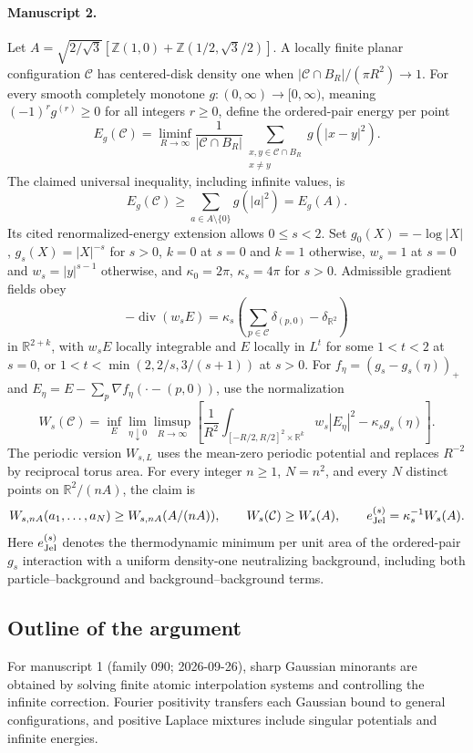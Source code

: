 \documentclass[11pt]{article}
\begin{document}
\paragraph{Manuscript 2.}
Let $A=\sqrt{2/\sqrt3}[\mathbb Z(1,0)+\mathbb Z(1/2,\sqrt3/2)]$. A locally finite planar configuration $\mathcal C$ has centered-disk density one when $|\mathcal C\cap B_R|/(\pi R^2)\to1$. For every smooth completely monotone $g:(0,\infty)\to[0,\infty)$, meaning $(-1)^rg^{(r)}\ge0$ for all integers $r\ge0$, define the ordered-pair energy per point
\[
 E_g(\mathcal C)=\liminf_{R\to\infty}\frac1{|\mathcal C\cap B_R|}
 \sum_{\substack{x,y\in\mathcal C\cap B_R\\x\ne y}}g(|x-y|^2).
\]
The claimed universal inequality, including infinite values, is
\[
 E_g(\mathcal C)\ge\sum_{a\in A\setminus\{0\}}g(|a|^2)=E_g(A).
\]
Its cited renormalized-energy extension allows $0\le s<2$. Set $g_0(X)=-\log|X|$, $g_s(X)=|X|^{-s}$ for $s>0$, $k=0$ at $s=0$ and $k=1$ otherwise, $w_s=1$ at $s=0$ and $w_s=|y|^{s-1}$ otherwise, and $\kappa_0=2\pi$, $\kappa_s=4\pi$ for $s>0$. Admissible gradient fields obey
\[
 -\operatorname{div}(w_sE)=\kappa_s(\sum_{p\in\mathcal C}\delta_{(p,0)}-\delta_{\mathbb R^2})
\]
in $\mathbb R^{2+k}$, with $w_sE$ locally integrable and $E$ locally in $L^t$ for some $1<t<2$ at $s=0$, or $1<t<\min(2,2/s,3/(s+1))$ at $s>0$. For $f_{\eta}=(g_s-g_s(\eta))_+$ and $E_{\eta}=E-\sum_p\nabla f_{\eta}(\cdot-(p,0))$, use the normalization
\[
 W_s(\mathcal C)=\inf_E\lim_{\eta\downarrow0}\limsup_{R\to\infty}
 \left[\frac1{R^2}\int_{[-R/2,R/2]^2\times\mathbb R^k}w_s|E_{\eta}|^2
                -\kappa_sg_s(\eta)\right].
\]
The periodic version $W_{s,L}$ uses the mean-zero periodic potential and replaces $R^{-2}$ by reciprocal torus area. For every integer $n\ge1$, $N=n^2$, and every $N$ distinct points on $\mathbb R^2/(nA)$, the claim is
\[
 W_{s,nA}(a_1,\ldots,a_N)\ge W_{s,nA}(A/(nA)),\qquad
 W_s(\mathcal C)\ge W_s(A),\qquad
 e_{\rm Jel}^{(s)}=\kappa_s^{-1}W_s(A).
\]
Here $e_{\rm Jel}^{(s)}$ denotes the thermodynamic minimum per unit area of the ordered-pair $g_s$ interaction with a uniform density-one neutralizing background, including both particle--background and background--background terms.

\subsection{Outline of the argument}
For manuscript 1 (family 090; 2026-09-26), sharp Gaussian minorants are obtained by solving finite atomic interpolation systems and controlling the infinite correction. Fourier positivity transfers each Gaussian bound to general configurations, and positive Laplace mixtures include singular potentials and infinite energies.
\end{document}
